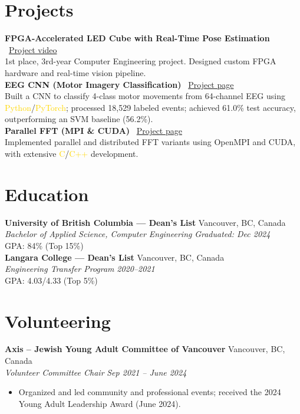 \documentclass[11pt]{article}
\newcommand{\gold}[1]{\textcolor{gold}{#1}}
\newcommand{\resumeItem}[1]{\item\small{#1}}
\newcommand{\resumeSubheading}[4]{%
  \textbf{#1} \hfill #2\\
  \textit{#3} \hfill \textit{#4}\\
}
\begin{document}
\section{Projects}
\textbf{FPGA-Accelerated LED Cube with Real-Time Pose Estimation} \textbar\ \href{https://www.youtube.com/watch?v=kbrSmiwQhu4&ab_channel=AdinMauer}{Project video}\\
1st place, 3rd-year Computer Engineering project. Designed custom FPGA hardware and real-time vision pipeline.\\
\textbf{EEG CNN (Motor Imagery Classification)} \textbar\ \href{https://mauer4.github.io/project/eeg_cnn/}{Project page}\\
Built a CNN to classify 4-class motor movements from 64-channel EEG using \gold{Python}/\gold{PyTorch}; processed 18,529 labeled events; achieved 61.0\% test accuracy, outperforming an SVM baseline (56.2\%).\\
\textbf{Parallel FFT (MPI \& CUDA)} \textbar\ \href{https://mauer4.github.io/project/parallel_fft/}{Project page}\\
Implemented parallel and distributed FFT variants using OpenMPI and CUDA, with extensive \gold{C}/\gold{C++} development.

\section{Education}
\resumeSubheading{University of British Columbia --- Dean's List}{Vancouver, BC, Canada}{Bachelor of Applied Science, Computer Engineering}{Graduated: Dec 2024}
GPA: 84\% (Top 15\%)\\
\resumeSubheading{Langara College --- Dean's List}{Vancouver, BC, Canada}{Engineering Transfer Program}{2020--2021}
GPA: 4.03/4.33 (Top 5\%)

\section{Volunteering}
\resumeSubheading{Axis -- Jewish Young Adult Committee of Vancouver}{Vancouver, BC, Canada}{Volunteer Committee Chair}{Sep 2021 -- June 2024}
\vspace{-10pt}
\begin{itemize}[leftmargin=*]
  \resumeItem{Organized and led community and professional events; received the 2024 Young Adult Leadership Award (June 2024).}
\end{itemize}
\end{document}
